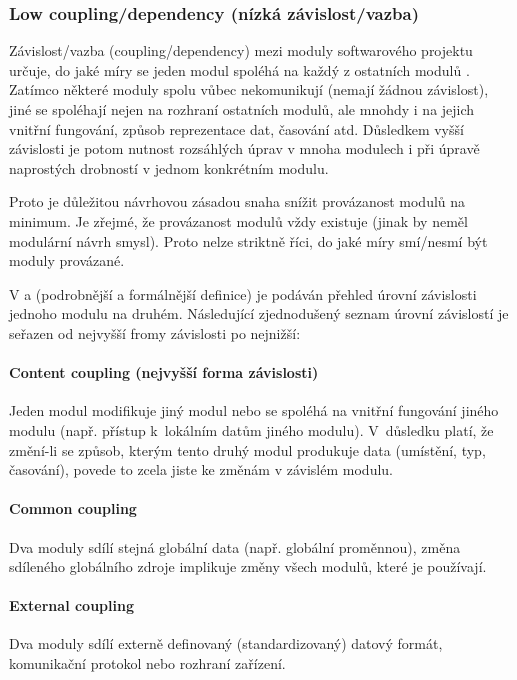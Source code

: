 
\subsubsection{Low coupling/dependency (nízká závislost/vazba)}
Závislost/vazba (coupling/dependency) mezi moduly softwarového projektu určuje, do jaké míry se jeden modul spoléhá na každý z ostatních modulů \cite{wiki:coupling}. Zatímco některé moduly spolu vůbec nekomunikují (nemají žádnou závislost), jiné se spoléhají nejen na rozhraní ostatních modulů, ale mnohdy i na jejich vnitřní fungování, způsob reprezentace dat, časování atd. Důsledkem vyšší závislosti je potom nutnost rozsáhlých úprav v mnoha modulech i při úpravě naprostých drobností v jednom konkrétním modulu.

Proto je důležitou návrhovou zásadou snaha snížit provázanost modulů na minimum. Je zřejmé, že provázanost modulů vždy existuje (jinak by neměl modulární návrh smysl). Proto nelze striktně říci, do jaké míry smí/nesmí být moduly provázané.

V \cite{wiki:coupling} a \cite{STVR:STVR162} (podrobnější a formálnější definice) je podáván přehled úrovní závislosti jednoho modulu na druhém. Následující zjednodušený seznam úrovní závislostí je seřazen od nejvyšší fromy závislosti po nejnižší:

\paragraph{Content coupling (nejvyšší forma závislosti)} Jeden modul modifikuje jiný modul nebo se spoléhá na vnitřní fungování jiného modulu (např. přístup k~lokálním datům jiného modulu). V~důsledku platí, že změní-li se způsob, kterým tento druhý modul produkuje data (umístění, typ, časování), povede to zcela jiste ke změnám v závislém modulu.

\paragraph{Common coupling} Dva moduly sdílí stejná globální data (např. globální proměnnou), změna sdíleného globálního zdroje implikuje změny všech modulů, které je používají.

\paragraph{External coupling} Dva moduly sdílí externě definovaný (standardizovaný) datový formát, komunikační protokol nebo rozhraní zařízení.


